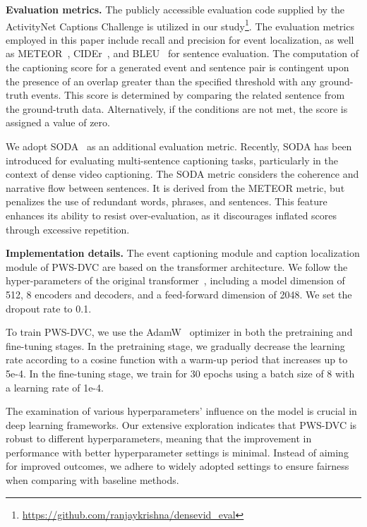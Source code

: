 \textbf{Evaluation metrics.}
The publicly accessible evaluation code supplied by the ActivityNet Captions Challenge is utilized in our study\footnote{\url{https://github.com/ranjaykrishna/densevid_eval}}.
The evaluation metrics employed in this paper include recall and precision for event localization, as well as METEOR~\cite{Banerjee2005-zo}, CIDEr~\cite{Vedantam2015-ma}, and BLEU~\cite{Papineni2002-sn} for sentence evaluation.
The computation of the captioning score for a generated event and sentence pair is contingent upon the presence of an overlap greater than the specified threshold with any ground-truth events.
This score is determined by comparing the related sentence from the ground-truth data.
Alternatively, if the conditions are not met, the score is assigned a value of zero.

We adopt SODA~\cite{Fujita2020-ob} as an additional evaluation metric.
Recently, SODA has been introduced for evaluating multi-sentence captioning tasks, particularly in the context of dense video captioning.
The SODA metric considers the coherence and narrative flow between sentences.
It is derived from the METEOR metric, but penalizes the use of redundant words, phrases, and sentences.
This feature enhances its ability to resist over-evaluation, as it discourages inflated scores through excessive repetition.

\textbf{Implementation details.}
The event captioning module and caption localization module of PWS-DVC are based on the transformer architecture.
We follow the hyper-parameters of the original transformer~\cite{Vaswani2017-sc}, including a model dimension of 512, 8 encoders and decoders, and a feed-forward dimension of 2048.
We set the dropout rate to 0.1.

To train PWS-DVC, we use the AdamW~\cite{Loshchilov2017-sm} optimizer in both the pretraining and fine-tuning stages.
In the pretraining stage, we gradually decrease the learning rate according to a cosine function with a warm-up period that increases up to 5e-4.
In the fine-tuning stage, we train for 30 epochs using a batch size of 8 with a learning rate of 1e-4.

The examination of various hyperparameters' influence on the model is crucial in deep learning frameworks.
Our extensive exploration indicates that PWS-DVC is robust to different hyperparameters, meaning that the improvement in performance with better hyperparameter settings is minimal.
Instead of aiming for improved outcomes, we adhere to widely adopted settings to ensure fairness when comparing with baseline methods.



